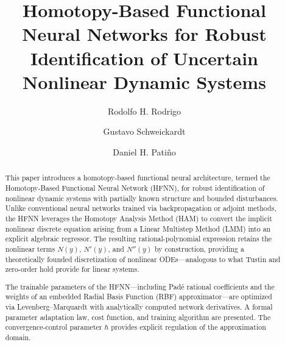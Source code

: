 \documentclass[preprint,12pt]{elsarticle}
\begin{document}
\begin{frontmatter}

\title{Homotopy-Based Functional Neural Networks for Robust Identification of Uncertain Nonlinear Dynamic Systems}

\author[unsj]{Rodolfo H. Rodrigo}

\author[utn]{Gustavo Schweickardt}

\author[inaut]{Daniel H. Pati\~no}





\begin{abstract}
This paper introduces a homotopy-based functional neural architecture, termed the Homotopy-Based Functional Neural Network (HFNN), for robust identification of nonlinear dynamic systems with partially known structure and bounded disturbances. Unlike conventional neural networks trained via backpropagation or adjoint methods, the HFNN leverages the Homotopy Analysis Method (HAM) to convert the implicit nonlinear discrete equation arising from a Linear Multistep Method (LMM) into an explicit algebraic regressor. The resulting rational-polynomial expression retains the nonlinear terms $N(y)$, $N'(y)$, and $N''(y)$ by construction, providing a theoretically founded discretization of nonlinear ODEs---analogous to what Tustin and zero-order hold provide for linear systems.

The trainable parameters of the HFNN---including Pad\'e rational coefficients and the weights of an embedded Radial Basis Function (RBF) approximator---are optimized via Levenberg--Marquardt with analytically computed network derivatives. A formal parameter adaptation law, cost function, and training algorithm are presented. The convergence-control parameter $\hbar$ provides explicit regulation of the approximation domain.


\end{abstract}
\end{frontmatter}
\end{document}
